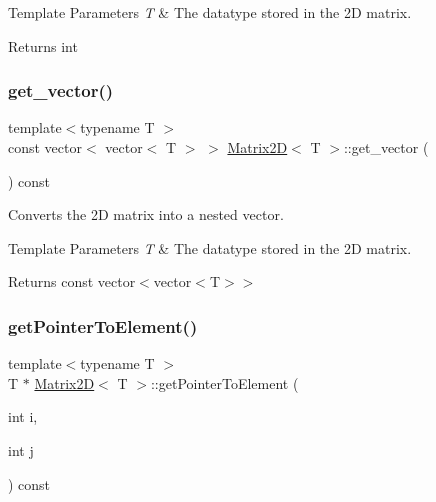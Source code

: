\begin{DoxyTemplParams}{Template Parameters}
{\em T} & The datatype stored in the 2D matrix. \\
\hline
\end{DoxyTemplParams}
\begin{DoxyReturn}{Returns}
int 
\end{DoxyReturn}
\mbox{\label{classMatrix2D_a2cd319270ca890e47dad636b9af34a11}} 
\subsubsection{\texorpdfstring{get\+\_\+vector()}{get\_vector()}}
{\footnotesize\ttfamily template$<$typename T $>$ \\
const vector$<$ vector$<$ T $>$ $>$ \mbox{\hyperlink{classMatrix2D}{Matrix2D}}$<$ T $>$\+::get\+\_\+vector (\begin{DoxyParamCaption}{ }\end{DoxyParamCaption}) const}



Converts the 2D matrix into a nested vector. 


\begin{DoxyTemplParams}{Template Parameters}
{\em T} & The datatype stored in the 2D matrix. \\
\hline
\end{DoxyTemplParams}
\begin{DoxyReturn}{Returns}
const vector$<$vector$<$\+T$>$$>$ 
\end{DoxyReturn}
\mbox{\label{classMatrix2D_ac3d6fbe385374e65ce00a34be5a7d323}} 
\subsubsection{\texorpdfstring{get\+Pointer\+To\+Element()}{getPointerToElement()}}
{\footnotesize\ttfamily template$<$typename T $>$ \\
T $\ast$ \mbox{\hyperlink{classMatrix2D}{Matrix2D}}$<$ T $>$\+::get\+Pointer\+To\+Element (\begin{DoxyParamCaption}\item[{int}]{i,  }\item[{int}]{j }\end{DoxyParamCaption}) const}



